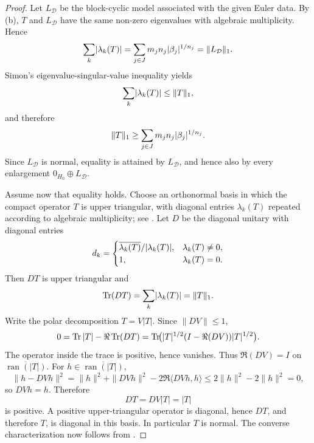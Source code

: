 \begin{proof}
  Let \(L_{\mathcal D}\) be the block-cyclic model associated with the
  given Euler data. By
  \textup{(b)},
  \(T\) and \(L_{\mathcal D}\) have the same non-zero eigenvalues with
  algebraic multiplicity. Hence
  \[
    \sum_k\lvert \lambda_k(T) \rvert
    =\sum_{j\in J}m_jn_j\lvert \beta_j \rvert^{1/n_j}
    =\|L_{\mathcal D}\|_1.
  \]
  Simon's eigenvalue-singular-value inequality
  \cite[Theorem~1.15]{Simon2005TraceIdeals} yields
  \[
    \sum_k\lvert \lambda_k(T) \rvert\le \|T\|_1,
  \]
  and therefore
  \[
    \|T\|_1
    \ge \sum_{j\in J}m_jn_j\lvert \beta_j \rvert^{1/n_j}.
  \]
  Since \(L_{\mathcal D}\) is normal, equality is attained by
  \(L_{\mathcal D}\), and hence also by every enlargement
  \(0_{H_0}\oplus L_{\mathcal D}\).

  Assume now that equality holds. Choose an orthonormal basis in which
  the compact operator \(T\) is upper triangular, with diagonal entries
  \(\lambda_k(T)\) repeated according to algebraic multiplicity; see
  \cite{Ringrose1971}. Let
  \(D\) be the diagonal unitary with diagonal entries
  \[
    d_k=
    \begin{cases}
      \overline{\lambda_k(T)}/\lvert \lambda_k(T) \rvert,
        & \lambda_k(T)\ne 0,\\
      1, & \lambda_k(T)=0.
    \end{cases}
  \]
  Then \(DT\) is upper triangular and
  \[
    \operatorname{Tr}(DT)=\sum_k\lvert \lambda_k(T) \rvert=\|T\|_1.
  \]
  Write the polar decomposition \(T=V|T|\). Since \(\|DV\|\le 1\),
  \[
    0
    =\operatorname{Tr}|T|-\Re\operatorname{Tr}(DT)
    =\operatorname{Tr}\!\bigl(|T|^{1/2}(I-\Re(DV))|T|^{1/2}\bigr).
  \]
  The operator inside the trace is positive, hence vanishes. Thus
  \(\Re(DV)=I\) on \(\overline{\operatorname{ran}(|T|)}\). For
  \(h\in\overline{\operatorname{ran}(|T|)}\),
  \[
    \|h-DVh\|^2
    =\|h\|^2+\|DVh\|^2-2\Re\langle DVh,h\rangle
    \le 2\|h\|^2-2\|h\|^2=0,
  \]
  so \(DVh=h\). Therefore
  \[
    DT=DV|T|=|T|
  \]
  is positive. A positive upper-triangular operator is diagonal, hence
  \(DT\), and therefore \(T\), is diagonal in this basis. In
  particular \(T\) is normal. The converse characterization now follows
  from .
\end{proof}

